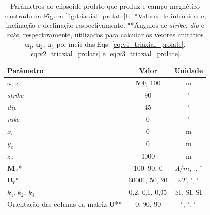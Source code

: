 \begin{table}[h!]
	\begin{center}
		\begin{tabular}{|l|c|c|}
			\hline
			\textbf{Parâmetro}  & \textbf{Valor}  & \textbf{Unidade}\\
			\hline 
			$a$, $b$  & 500, 100 & m\\
			\hline
			\textit{strike}   & $90$ & $^{\circ}$\\
			\hline
			\textit{dip}    & $45$ & $^{\circ}$\\
			\hline
			\textit{rake}   & $0$  & $^{\circ}$\\
			\hline
			$x_c$   & 0  & m\\
			\hline          
			$y_c$   & 0  & m\\
			\hline                
			$z_c$  & 1000  & m\\
			\hline
			$\mathbf{M}_{R}$*  & 100, $90$, $0$  & $A/m$, $^{\circ}$, $^{\circ}$\\
			\hline
			$\mathbf{B}_{0}$*    & 60000, $50$, $20$ & $nT$, $^{\circ}$, $^{\circ}$\\
			\hline
			$k_{1}$, $k_{2}$, $k_{3}$   & 0,2, 0,1, 0,05  & SI, SI, SI\\
			\hline
			Orientação das colunas da matriz $\mathbf{U}$**   & $0$, $90$, $90$  & $^{\circ}$, $^{\circ}$, $^{\circ}$\\
			\hline
		\end{tabular}
		\caption{Parâmetros do elipsoide prolato que produz o campo magnético mostrado na Figura \ref{fig:triaxial_prolate}B. *Valores de intensidade, inclinação e declinação respectivamente. **Ângulos de \textit{strike}, \textit{dip}  e \textit{rake}, respectivamente, utilizados para calcular os vetores unitários $\mathbf{u}_{1}$, $\mathbf{u}_{2}$, $\mathbf{u}_{3}$ por meio das Eqs. \ref{eq:v1_triaxial_prolate}, \ref{eq:v2_triaxial_prolate} e \ref{eq:v3_triaxial_prolate}.}
	\end{center}
	\label{tab:triaxial_prolate2}
\end{table}

